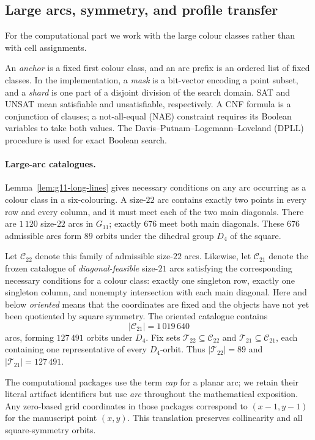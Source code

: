 \documentclass[11pt]{article}
\theoremstyle{definition}
\theoremstyle{remark}
\newcommand{\Dfour}{D_4}
\begin{document}
\subsection{Large arcs, symmetry, and profile transfer}

For the computational part we work with the large colour classes rather
than with cell assignments.

An \emph{anchor} is a fixed first colour class, and an arc prefix is an
ordered list of fixed classes.  In the implementation, a \emph{mask} is a
bit-vector encoding a point subset, and a \emph{shard} is one part of a
disjoint division of the search domain.
SAT and UNSAT mean satisfiable and unsatisfiable, respectively.  A CNF
formula is a conjunction of clauses; a not-all-equal (NAE) constraint
requires its Boolean variables to take both values.
The Davis--Putnam--Logemann--Loveland (DPLL) procedure
\cite{DavisLogemannLoveland1962} is used for exact Boolean search.

\paragraph{Large-arc catalogues.}
Lemma~\ref{lem:g11-long-lines} gives necessary conditions on any arc occurring
as a colour class in a six-colouring.  A size-\(22\) arc contains exactly two
points in every row and every column, and it must meet each of the two main
diagonals.  There are \(1\,120\) size-\(22\) arcs in \(G_{11}\); exactly
\(676\) meet both main diagonals.  These \(676\) admissible arcs form
\(89\) orbits under the dihedral group \(\Dfour\) of the square.

Let \(\mathcal C_{22}\) denote this family of admissible size-\(22\) arcs.
Likewise, let \(\mathcal C_{21}\) denote the frozen catalogue of
\emph{diagonal-feasible} size-\(21\) arcs satisfying the corresponding
necessary conditions for a colour class: exactly one singleton row, exactly
one singleton column, and nonempty intersection with each main diagonal.
Here and below \emph{oriented} means that the coordinates are fixed and the
objects have not yet been quotiented by square symmetry.  The oriented
catalogue contains
\[
  |\mathcal C_{21}|=1\,019\,640
\]
arcs, forming \(127\,491\) orbits under \(\Dfour\).
Fix sets \(\mathcal T_{22}\subseteq\mathcal C_{22}\) and
\(\mathcal T_{21}\subseteq\mathcal C_{21}\), each containing one
representative of every \(\Dfour\)-orbit.  Thus
\(|\mathcal T_{22}|=89\) and \(|\mathcal T_{21}|=127\,491\).

The computational packages use the term \emph{cap} for a planar arc;
we retain their literal artifact identifiers but use \emph{arc} throughout
the mathematical exposition.  Any zero-based grid coordinates in those
packages correspond to \((x-1,y-1)\) for the manuscript point \((x,y)\).
This translation preserves collinearity and all square-symmetry orbits.
\end{document}
